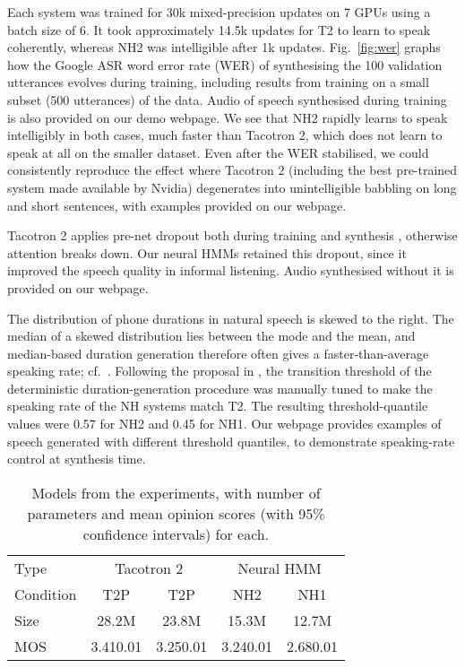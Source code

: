 \documentclass[british]{article}
\newcommand{\tc}{T2}
\newcommand{\tcp}{T2P}
\newcommand{\tcnop}{T2P}
\newcommand{\nh}{NH}
\newcommand{\nhtwo}{NH2}
\newcommand{\nhone}{NH1}
\begin{document}
Each system was trained for 30k mixed-precision updates on 7 GPUs using a batch size of 6.
It took approximately 14.5k updates for \tc{} to learn to
speak coherently, whereas \nhtwo{}
was intelligible after 1k updates.
Fig.\ \ref{fig:wer} graphs how the Google ASR word error rate (WER) of synthesising the 100 validation utterances evolves during training, including results from training on a small subset (500 utterances) of the data.
Audio of speech synthesised during training is also provided on our demo webpage.
We see that \nhtwo{} rapidly learns to speak intelligibly in both cases, much faster than Tacotron 2, which does not learn to speak at all on the smaller dataset.
Even after the WER stabilised, we could consistently reproduce the effect where Tacotron 2 (including the best pre-trained system made available by Nvidia) degenerates into unintelligible babbling on long and short sentences, with examples provided on our webpage.


Tacotron 2 applies pre-net dropout both during training and synthesis \cite{shen2018natural}, otherwise attention breaks down.
Our neural HMMs retained this dropout, since it improved the speech quality in informal listening.
Audio synthesised without it is provided on our webpage.


The distribution of phone durations in natural speech is skewed to the right.
The median of a skewed distribution lies between the mode and the mean, and median-based duration generation therefore often gives a faster-than-average speaking rate; cf.\ \cite{henter2016robust}.
Following the proposal in \cite{henter2017nonparametric}, the transition threshold of the deterministic duration-generation procedure was manually tuned to make the speaking rate of the \nh{} systems match \tc{}.
The resulting threshold-quantile values were 0.57 for \nhtwo{} and 0.45 for \nhone{}.
Our webpage provides examples of speech generated with different threshold quantiles, to demonstrate speaking-rate control at synthesis time.
\begin{table}[!t]
\centering
\begin{tabular}{@{}lcccc@{}}
\toprule 
Type & \multicolumn{2}{c}{Tacotron 2} & \multicolumn{2}{c}{Neural HMM}\\
Condition & \tcp{} & \tcnop{} & \nhtwo{} & \nhone{}\\
\midrule 
Size & 28.2M & 23.8M & 15.3M & 12.7M\\
MOS & 3.410.01 & 3.250.01 & 3.240.01 & 2.680.01\\
\bottomrule
\end{tabular}\caption{Models from the experiments, with number of parameters and mean opinion scores (with 95\% confidence intervals) for each.}
\label{tab:results}
\vspace{-0.8\baselineskip}
\end{table}
\end{document}
